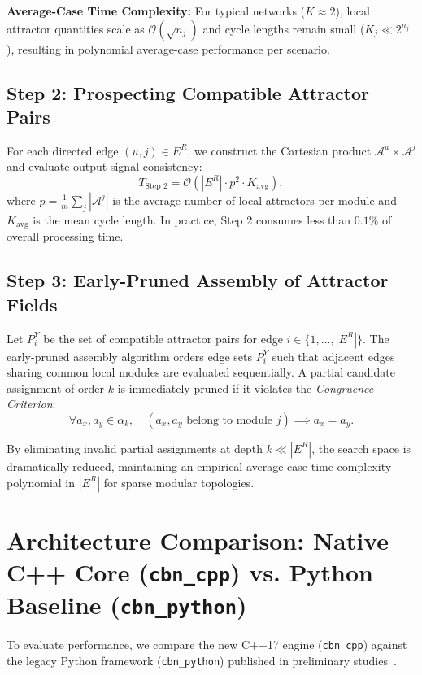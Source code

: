 \documentclass{svproc}
\begin{document}
\textbf{Average-Case Time Complexity:} For typical networks ($K \approx 2$), local attractor quantities scale as $\mathcal{O}(\sqrt{n_j})$ and cycle lengths remain small ($K_j \ll 2^{n_j}$), resulting in polynomial average-case performance per scenario.

\subsection{Step 2: Prospecting Compatible Attractor Pairs}
For each directed edge $(u, j) \in E^R$, we construct the Cartesian product $\mathcal{A}^u \times \mathcal{A}^j$ and evaluate output signal consistency:
\begin{equation}
    T_{\text{Step 2}} = \mathcal{O}\left(|E^R| \cdot p^2 \cdot K_{\text{avg}}\right),
\end{equation}
where $p = \frac{1}{m}\sum_j |\mathcal{A}^j|$ is the average number of local attractors per module and $K_{\text{avg}}$ is the mean cycle length. In practice, Step 2 consumes less than $0.1\%$ of overall processing time.

\subsection{Step 3: Early-Pruned Assembly of Attractor Fields}
Let $P_i^Y$ be the set of compatible attractor pairs for edge $i \in \{1, \dots, |E^R|\}$. The early-pruned assembly algorithm orders edge sets $P_i^Y$ such that adjacent edges sharing common local modules are evaluated sequentially. A partial candidate assignment of order $k$ is immediately pruned if it violates the \emph{Congruence Criterion}:
\begin{equation}
    \forall a_x, a_y \in \alpha_k, \quad (a_x, a_y \text{ belong to module } j) \implies a_x = a_y.
\end{equation}

By eliminating invalid partial assignments at depth $k \ll |E^R|$, the search space is dramatically reduced, maintaining an empirical average-case time complexity polynomial in $|E^R|$ for sparse modular topologies.

\section{Architecture Comparison: Native C++ Core (\texttt{cbn\_cpp}) vs. Python Baseline (\texttt{cbn\_python})}

To evaluate performance, we compare the new C++17 engine (\texttt{cbn\_cpp}) against the legacy Python framework (\texttt{cbn\_python}) published in preliminary studies~\cite{tovar2022method,rozante2022efficient}.
\end{document}

